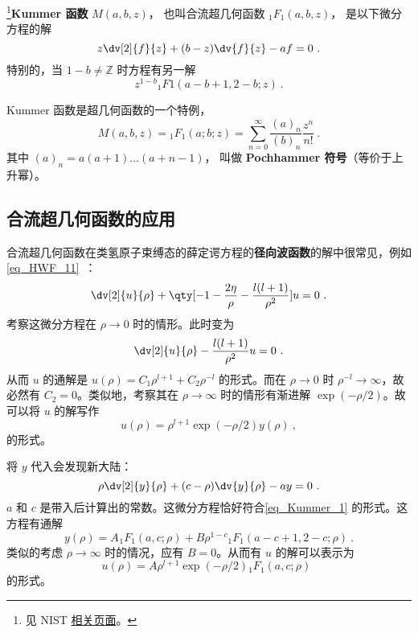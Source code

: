 
\begin{issues}
\issueDraft
\end{issues}

\footnote{见 NIST \href{https://dlmf.nist.gov/13.2}{相关页面}。}\textbf{Kummer 函数} $M(a, b, z)$， 也叫合流超几何函数 $_1F_1(a, b, z)$， 是以下微分方程的解
\begin{equation}\label{eq_Kummer_1}
z\dv[2]{f}{z} + (b-z)\dv{f}{z} - a f = 0~.
\end{equation}
特别的，当 $1 - b \neq \mathbb Z$ 时方程有另一解
$$z^{1-b} {_1F1}(a-b+1, 2-b; z)~.$$

Kummer 函数是超几何函数的一个特例， 
\begin{equation}
M(a, b, z) = {_1F_1}(a; b; z) = \sum_{n=0}^\infty \frac{(a)_n}{(b)_n} \frac{z^n}{n!}~.
\end{equation}
其中 $(a)_n = a(a+1)\dots(a+n-1)$， 叫做 \textbf{Pochhammer 符号}（等价于上升幂）。

\subsection{合流超几何函数的应用}
合流超几何函数在类氢原子束缚态的薛定谔方程的\textbf{径向波函数}的解中很常见，例如\autoref{eq_HWF_11}~：
\begin{equation}
\dv[2]{u}{\rho} + \qty[-1 - \frac{2\eta}{\rho} - \frac{l(l+1)}{\rho^2}]u = 0~.
\end{equation}
考察这微分方程在 $\rho \rightarrow 0$ 时的情形。此时变为
\begin{equation}
\dv[2]{u}{\rho} - \frac{l(l+1)}{\rho^2} u = 0 ~.
\end{equation}
从而 $u$ 的通解是 $u(\rho) = C_1 \rho^{l+1} + C_2 \rho^{-l}$ 的形式。而在 $\rho \rightarrow 0$ 时 $\rho^{-l} \rightarrow \infty$，故必然有 $C_2 = 0$。类似地，考察其在 $\rho \rightarrow \infty$ 时的情形有渐进解 $\exp(-\rho/2)$。故可以将 $u$ 的解写作
\begin{equation}
u(\rho) = \rho^{l+1} \exp(-\rho/2) y(\rho) ~,
\end{equation}
的形式。

将 $y$ 代入会发现新大陆：
\begin{equation}
\rho \dv[2]{y}{\rho} + (c-\rho)\dv{y}{\rho} -ay = 0 ~.
\end{equation}
$a$ 和 $c$ 是带入后计算出的常数。这微分方程恰好符合\autoref{eq_Kummer_1} 的形式。这方程有通解
\begin{equation}
y(\rho) = A_{} {}_{1}F_1(a, c; \rho) + B \rho^{1-c}{}  _{1}F_{1}(a-c+1, 2-c; \rho) ~.
\end{equation}
类似的考虑 $\rho\rightarrow \infty$ 时的情况，应有 $B=0$。从而有 $u$ 的解可以表示为
\begin{equation}
u(\rho) = A \rho^{l+1} \exp(-\rho/2) {_1F_1}(a, c; \rho) ~~
\end{equation}
的形式。